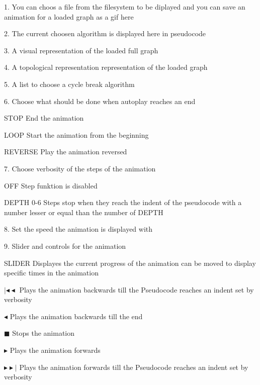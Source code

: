 \begin{list}{-}{}
\item[1.] You can choos a file from the filesystem to be diplayed and you can save an animation for a loaded graph as a gif here
\item[2.] The current choosen algorithm is displayed here in pseudocode
\item[3.] A visual representation of the loaded full graph
\item[4.] A topological representation representation of the loaded graph
\item[5.] A list to choose a cycle break algorithm
\item[6.] Choose what should be done when autoplay reaches an end
\begin{list}{-}{}
\item[STOP] End the animation
\item[LOOP] Start the animation from the beginning
\item[REVERSE] Play the animation reversed
\end{list}
\item[7.] Choose verbosity of the steps of the animation
\begin{list}{-}{}
\item[OFF] Step funktion is disabled
\item[DEPTH 0-6] Steps stop when they reach the indent of the pseudocode with a number lesser or equal than the number of DEPTH
\end{list}
\item[8.] Set the speed the animation is displayed with
\item[9.] Slider and controls for the animation
\begin{list}{-}{}
\item[SLIDER] Displayes the current progress of the animation can be moved to display specific times in the animation
\item[ $| \blacktriangleleft \blacktriangleleft$ ] Plays the animation backwards till the Pseudocode reaches an indent set by verbosity
\item[ $\blacktriangleleft$ ] Plays the animation backwards till the end
\item[$ \blacksquare $] Stops the animation
\item[$ \blacktriangleright $] Plays the animation forwards
\item[$ \blacktriangleright \blacktriangleright |$]  Plays the animation forwards till the Pseudocode reaches an indent set by verbosity
\end{list}
\end{list}